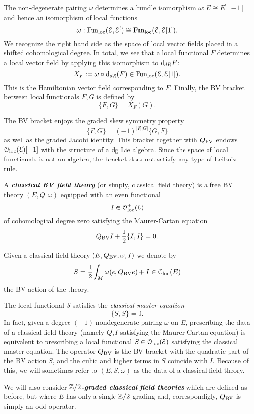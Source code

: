 \documentclass[10pt, oneside]{article}
\newcommand{\defterm}[1]{\textbf{\emph{#1}}}
\begin{document}
The non-degenerate pairing $\omega$ determines a bundle isomorphism $\omega : E \cong E^! [-1]$ and hence an isomorphism of local functions
\[
\omega : {\rm Fun}_{\rm loc}(\mathcal E, \mathcal E^!) \cong {\rm Fun}_{\rm loc}(\mathcal E, \mathcal E[1]) .
\]
We recognize the right hand side as the space of local vector fields placed in a shifted cohomological degree.
In total, we see that a local functional $F$ determines a local vector field by applying this isomorphism to ${\rm d}_{dR}F$:
\[
X_F := \omega \circ {\rm d}_{dR} (F) \in  {\rm Fun}_{\rm loc}(\mathcal E, \mathcal E[1])  .
\]
This is the Hamiltonian vector field corresponding to $F$. 
Finally, the BV bracket between local functionals $F, G$ is defined by
\[
\{F, G\} = X_F (G) .
\]

The BV bracket enjoys the graded skew symmetry property
\[
\{F, G\} = (-1)^{|F| |G|} \{G, F\}
\]
as well as the graded Jacobi identity.
This bracket together wtih $Q_{\mathrm{BV}}$ endows $\mathcal{O}_{\rm loc}(\mathcal E)[-1]$ with the structure of a dg Lie algebra. 
Since the space of local functionals is not an algebra, the bracket does not satisfy any type of Leibniz rule. 


\begin{definition}
A \defterm{classical BV field theory} (or simply, classical field theory) is a free BV theory $(E, Q, \omega)$ equipped with an even functional
\[I \in \mathcal{O}_{\rm loc}^+(\mathcal E)\]
of cohomological degree zero satisfying the Maurer-Cartan equation
\[Q_{\mathrm{BV}} I + \frac{1}{2} \{I,I\} = 0 .\]
\end{definition}

Given a classical field theory $(E, Q_{\mathrm{BV}}, \omega, I)$ we denote by
\[S = \frac{1}{2} \int_M \omega(e, Q_{\mathrm{BV}} e) + I\in \mathcal{O}_{\rm loc}(E)\]
the BV action of the theory.

The local functional $S$ satisfies the {\em classical master equation} \[\{S, S\} = 0.\] 
In fact, given a degree $(-1)$ nondegenerate pairing $\omega$ on $E$, prescribing the data of a classical field theory (namely $Q, I$ satisfying the Maurer-Cartan equation) is equivalent to prescribing a local functional $S \in \mathcal{O}_{\rm loc}(\mathcal E)$ satisfying the classical master equation.
The operator $Q_{\mathrm{BV}}$ is the BV bracket with the quadratic part of the BV action $S$, and the cubic and higher terms in $S$ coincide with $I$.
Because of this, we will sometimes refer to $(E, S, \omega)$ as the data of a classical field theory.

\begin{remark}
We will also consider \defterm{$\mathbb Z/2$-graded classical field theories} which are defined as before, but where $E$ has only a single $\mathbb Z/2$-grading and, correspondigly, $Q_{\mathrm{BV}}$ is simply an odd operator.
\end{remark}
\end{document}
